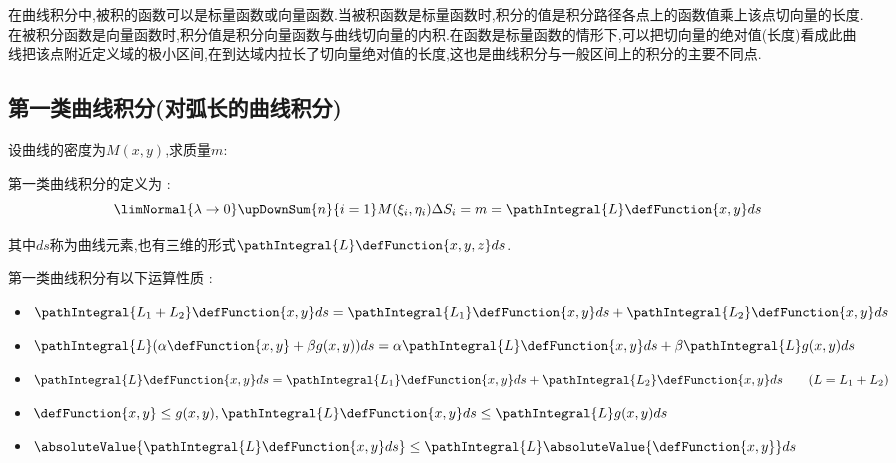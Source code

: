 {{  在曲线积分中,被积的函数可以是标量函数或向量函数.当被积函数是标量函数时,积分的值是积分路径各点上的函数值乘上该点切向量的长度.在被积分函数是向量函数时,积分值是积分向量函数与曲线切向量的内积.在函数是标量函数的情形下,可以把切向量的绝对值(长度)看成此曲线把该点附近定义域的极小区间,在到达域内拉长了切向量绝对值的长度,这也是曲线积分与一般区间上的积分的主要不同点.

  \subsection{第一类曲线积分(对弧长的曲线积分)}{
    设曲线的密度为$M(x,y)$,求质量$m$:

    \begin{center}
    \end{center}

    第一类曲线积分的定义为 :
    $$
      \limNormal{\lambda \to 0}\upDownSum{n}{i = 1}M(\xi_i,\eta_i)\Delta S_i = m = \pathIntegral{L}\defFunction{x,y}ds
    $$

    其中$ds$称为曲线元素,也有三维的形式$\pathIntegral{L}\defFunction{x,y,z}ds$.

    第一类曲线积分有以下运算性质 :
    \begin{itemize}
      \item $\pathIntegral{L_1 + L_2}\defFunction{x,y}ds = \pathIntegral{L_1}\defFunction{x,y}ds + \pathIntegral{L_2}\defFunction{x,y}ds$
      \item $\pathIntegral{L}(\alpha\defFunction{x,y} + \beta g(x,y))ds = \alpha\pathIntegral{L}\defFunction{x,y}ds + \beta\pathIntegral{L}g(x,y)ds$
      \item $\pathIntegral{L}\defFunction{x,y}ds = \pathIntegral{L_1}\defFunction{x,y}ds + \pathIntegral{L_2}\defFunction{x,y}ds \qquad (L = L_1 + L_2)$
      \item $\defFunction{x,y} \leq g(x,y),\pathIntegral{L}\defFunction{x,y}ds \leq \pathIntegral{L}g(x,y)ds$
      \item $\absoluteValue{\pathIntegral{L}\defFunction{x,y}ds} \leq \pathIntegral{L}\absoluteValue{\defFunction{x,y}}ds$
    \end{itemize}
  }%

}}
